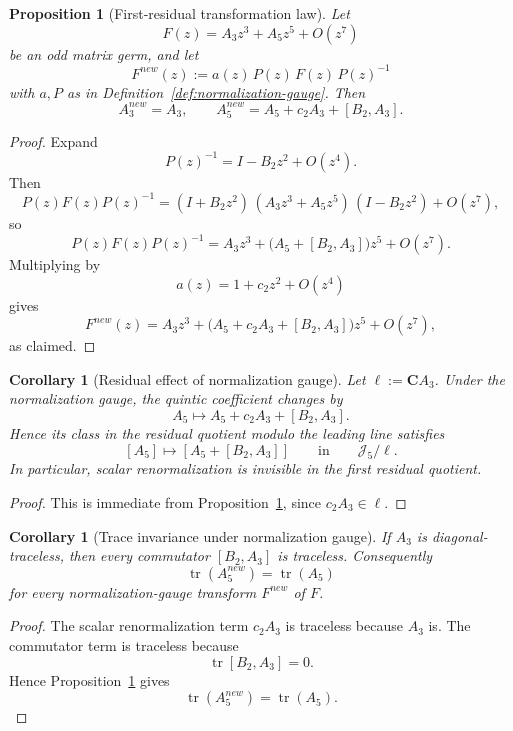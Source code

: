 \documentclass[11pt,a4paper]{amsart}
\def\new{new}%
\theoremstyle{plain}
\newtheorem{proposition}[theorem]{Proposition}
\newtheorem{corollary}[theorem]{Corollary}
\theoremstyle{definition}
\newcommand{\new}{\mathrm{new}}
\begin{document}
\begin{proposition}[First-residual transformation law]
\label{prop:first-residual-gauge-law}
Let
\[
F(z)=A_3 z^3+A_5 z^5+O(z^7)
\]
be an odd matrix germ, and let
\[
F^{\new}(z):=a(z)\,P(z)\,F(z)\,P(z)^{-1}
\]
with $a,P$ as in Definition~\ref{def:normalization-gauge}. Then
\[
A_3^{\new}=A_3,
\qquad
A_5^{\new}=A_5+c_2A_3+[B_2,A_3].
\]
\end{proposition}

\begin{proof}
Expand
\[
P(z)^{-1}=I-B_2 z^2+O(z^4).
\]
Then
\[
P(z)F(z)P(z)^{-1}
=
(I+B_2 z^2)\,(A_3 z^3+A_5 z^5)\,(I-B_2 z^2)+O(z^7),
\]
so
\[
P(z)F(z)P(z)^{-1}
=
A_3 z^3+\bigl(A_5+[B_2,A_3]\bigr)z^5+O(z^7).
\]
Multiplying by
\[
a(z)=1+c_2 z^2+O(z^4)
\]
gives
\[
F^{\new}(z)
=
A_3 z^3+\bigl(A_5+c_2A_3+[B_2,A_3]\bigr)z^5+O(z^7),
\]
as claimed.
\end{proof}

\begin{corollary}[Residual effect of normalization gauge]
\label{cor:first-residual-gauge-law}
Let $\ell:=\mathbf C A_3$. Under the normalization gauge,
the quintic coefficient changes by
\[
A_5 \longmapsto A_5 + c_2 A_3 + [B_2,A_3].
\]
Hence its class in the residual quotient modulo the leading line satisfies
\[
[A_5] \longmapsto [A_5+[B_2,A_3]]
\qquad\text{in}\qquad
\mathcal J_5/\ell.
\]
In particular, scalar renormalization is invisible in the first residual
quotient.
\end{corollary}

\begin{proof}
This is immediate from Proposition~\ref{prop:first-residual-gauge-law}, since
$c_2A_3\in \ell$.
\end{proof}

\begin{corollary}[Trace invariance under normalization gauge]
\label{cor:trace-invariant-under-normalization-gauge}
If $A_3$ is diagonal-traceless, then every commutator $[B_2,A_3]$ is
traceless. Consequently
\[
\operatorname{tr}(A_5^{\new})=\operatorname{tr}(A_5)
\]
for every normalization-gauge transform $F^{\new}$ of $F$.
\end{corollary}

\begin{proof}
The scalar renormalization term $c_2A_3$ is traceless because $A_3$ is.
The commutator term is traceless because
\[
\operatorname{tr}[B_2,A_3]=0.
\]
Hence Proposition~\ref{prop:first-residual-gauge-law} gives
\[
\operatorname{tr}(A_5^{\new})=\operatorname{tr}(A_5).
\]
\end{proof}
\end{document}
